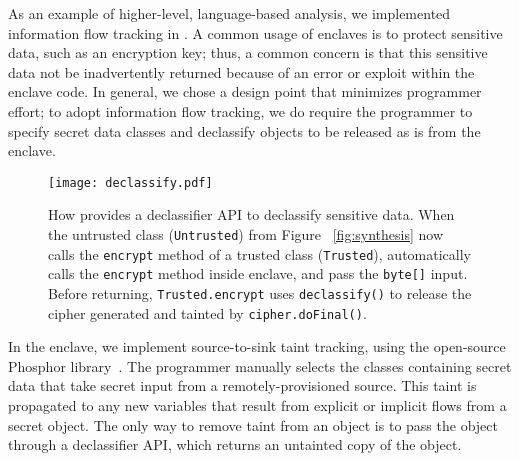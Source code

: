 As an example of higher-level, language-based analysis, we implemented information flow tracking
in \sysname{}.
A common usage of enclaves is to protect sensitive data, such as an encryption key;
thus, a common concern is that this sensitive data not be inadvertently returned because of an error or exploit within the enclave code.
In general, we chose a design point that minimizes programmer effort; to adopt information flow tracking, we
do require the programmer to specify secret data classes and declassify objects to be released as is from the enclave.

\begin{figure}[t!]
\centering
\texttt{[image: declassify.pdf]}
\footnotesize
\caption{How \sysname{} provides a declassifier API to declassify sensitive  data.
When the untrusted class ({\tt Untrusted}) from Figure ~\ref{fig:synthesis} now calls the {\tt encrypt} method of a trusted class ({\tt Trusted}),
\sysname{} automatically calls the {\tt encrypt} method inside enclave, and pass the {\tt byte[]} input.
Before returning, {\tt Trusted.encrypt} uses {\tt declassify()} to release the cipher generated and tainted  by {\tt cipher.doFinal()}.}
\label{fig:declassify}
\end{figure}



In the enclave, we implement source-to-sink taint tracking, using the open-source Phosphor library~\cite{phosphor}.
The programmer manually selects the classes containing secret data that take secret input from a remotely-provisioned source.
This taint is propagated to any new variables that result from explicit or implicit flows from a secret object.
The only way to remove taint from an object is to pass the object through a \sysname{} declassifier API,
which returns an untainted copy of the object.

